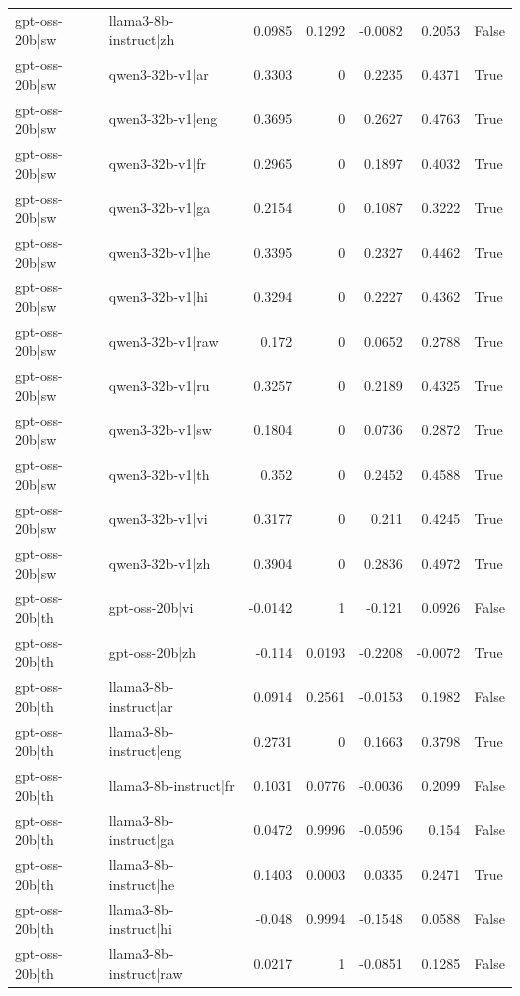 \begin{table}
\begin{tabular}{l l r r r r l}
gpt-oss-20b|sw & llama3-8b-instruct|zh & 0.0985 & 0.1292 & -0.0082 & 0.2053 & False \\
gpt-oss-20b|sw & qwen3-32b-v1|ar & 0.3303 & 0 & 0.2235 & 0.4371 & True \\
gpt-oss-20b|sw & qwen3-32b-v1|eng & 0.3695 & 0 & 0.2627 & 0.4763 & True \\
gpt-oss-20b|sw & qwen3-32b-v1|fr & 0.2965 & 0 & 0.1897 & 0.4032 & True \\
gpt-oss-20b|sw & qwen3-32b-v1|ga & 0.2154 & 0 & 0.1087 & 0.3222 & True \\
gpt-oss-20b|sw & qwen3-32b-v1|he & 0.3395 & 0 & 0.2327 & 0.4462 & True \\
gpt-oss-20b|sw & qwen3-32b-v1|hi & 0.3294 & 0 & 0.2227 & 0.4362 & True \\
gpt-oss-20b|sw & qwen3-32b-v1|raw & 0.172 & 0 & 0.0652 & 0.2788 & True \\
gpt-oss-20b|sw & qwen3-32b-v1|ru & 0.3257 & 0 & 0.2189 & 0.4325 & True \\
gpt-oss-20b|sw & qwen3-32b-v1|sw & 0.1804 & 0 & 0.0736 & 0.2872 & True \\
gpt-oss-20b|sw & qwen3-32b-v1|th & 0.352 & 0 & 0.2452 & 0.4588 & True \\
gpt-oss-20b|sw & qwen3-32b-v1|vi & 0.3177 & 0 & 0.211 & 0.4245 & True \\
gpt-oss-20b|sw & qwen3-32b-v1|zh & 0.3904 & 0 & 0.2836 & 0.4972 & True \\
gpt-oss-20b|th & gpt-oss-20b|vi & -0.0142 & 1 & -0.121 & 0.0926 & False \\
gpt-oss-20b|th & gpt-oss-20b|zh & -0.114 & 0.0193 & -0.2208 & -0.0072 & True \\
gpt-oss-20b|th & llama3-8b-instruct|ar & 0.0914 & 0.2561 & -0.0153 & 0.1982 & False \\
gpt-oss-20b|th & llama3-8b-instruct|eng & 0.2731 & 0 & 0.1663 & 0.3798 & True \\
gpt-oss-20b|th & llama3-8b-instruct|fr & 0.1031 & 0.0776 & -0.0036 & 0.2099 & False \\
gpt-oss-20b|th & llama3-8b-instruct|ga & 0.0472 & 0.9996 & -0.0596 & 0.154 & False \\
gpt-oss-20b|th & llama3-8b-instruct|he & 0.1403 & 0.0003 & 0.0335 & 0.2471 & True \\
gpt-oss-20b|th & llama3-8b-instruct|hi & -0.048 & 0.9994 & -0.1548 & 0.0588 & False \\
gpt-oss-20b|th & llama3-8b-instruct|raw & 0.0217 & 1 & -0.0851 & 0.1285 & False \\

\end{tabular}
\end{table}
